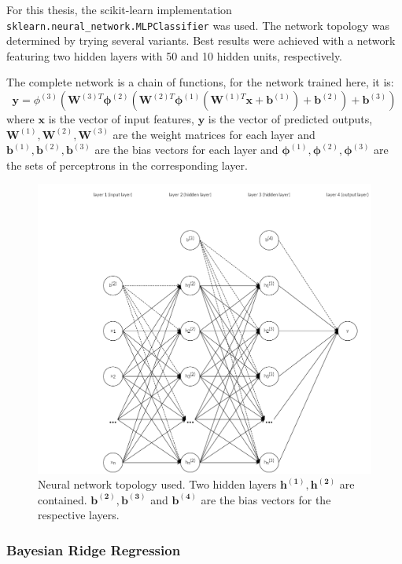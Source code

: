 \documentclass[
  11pt,
  a4paper,
  DIV=12,captions=tableheading,oneside,titlepage=firstiscover,abstracton]{scrreprt}
\begin{document}
For this thesis, the scikit-learn implementation \texttt{sklearn.neural\_network.MLPClassifier} was used. The network topology was determined by trying several variants. Best results were achieved with a network featuring two hidden layers with 50 and 10 hidden units, respectively.

The complete network is a chain of functions, for the network trained here, it is: \begin{equation}
\mathbf{y} = \phi^{(3)}(\mathbf{W}^{(3)T} \mathbf{\phi}^{(2)}(\mathbf{W}^{(2)T} \mathbf{\phi}^{(1)}(\mathbf{W}^{(1)T} \mathbf{x} + \mathbf{b}^{(1)}) + \mathbf{b}^{(2)}) + \mathbf{b}^{(3)})
\end{equation} where \(\mathbf{x}\) is the vector of input features, \(\mathbf{y}\) is the vector of predicted outputs, \(\mathbf{W}^{(1)}, \mathbf{W}^{(2)}, \mathbf{W}^{(3)}\) are the weight matrices for each layer and \(\mathbf{b}^{(1)}, \mathbf{b}^{(2)}, \mathbf{b}^{(3)}\) are the bias vectors for each layer and \(\mathbf{\phi}^{(1)}, \mathbf{\phi}^{(2)}, \mathbf{\phi}^{(3)}\) are the sets of perceptrons in the corresponding layer.



\begin{figure}

{\centering \includegraphics[width=0.6\linewidth]{figures/preprocessing/mlp-structure} 

}

\caption{Neural network topology used. Two hidden layers \(\mathbf{h^{(1)}, h^{(2)}}\) are contained. \(\mathbf{b^{(2)}, b^{(3)}}\) and \(\mathbf{b^{(4)}}\) are the bias vectors for the respective layers.}\label{fig:mlp-graph}
\end{figure}

\hypertarget{bayesian-ridge-regression}{%
\subsubsection{Bayesian Ridge Regression}\label{bayesian-ridge-regression}}
\end{document}
